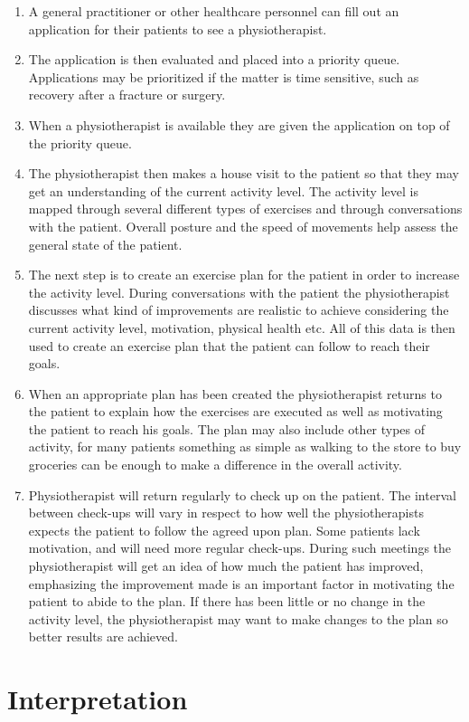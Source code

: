 \vspace{-4mm}
\begin{enumerate}
  \item A general practitioner or other healthcare personnel can fill out an application for their patients to see a physiotherapist.
  \item The application is then evaluated and placed into a priority queue. Applications may be prioritized if the matter is time sensitive, such as recovery after a fracture or surgery.
  \item When a physiotherapist is available they are given the application on top of the priority queue.
  \item The physiotherapist then makes a house visit to the patient so that they may get an understanding of the current activity level. The activity level is mapped through several different types of exercises and through conversations with the patient. Overall posture and the speed of movements help assess the general state of the patient.
  \item The next step is to create an exercise plan for the patient in order to increase the activity level. During conversations with the patient the physiotherapist discusses what kind of improvements are realistic to achieve considering the current activity level, motivation, physical health etc. All of this data is then used to create an exercise plan that the patient can follow to reach their goals.
  \item When an appropriate plan has been created the physiotherapist returns to the patient to explain how the exercises are executed as well as motivating the patient to reach his goals. The plan may also include other types of activity, for many patients something as simple as walking to the store to buy groceries can be enough to make a difference in the overall activity.
  \item Physiotherapist will return regularly to check up on the patient. The interval between check-ups will vary in respect to how well the physiotherapists expects the patient to follow the agreed upon plan. Some patients lack motivation, and will need more regular check-ups. During such meetings the physiotherapist will get an idea of how much the patient has improved, emphasizing the improvement made is an important factor in motivating the patient to abide to the plan. If there has been little or no change in the activity level, the physiotherapist may want to make changes to the plan so better results are achieved.
\end{enumerate}

\section{Interpretation}
